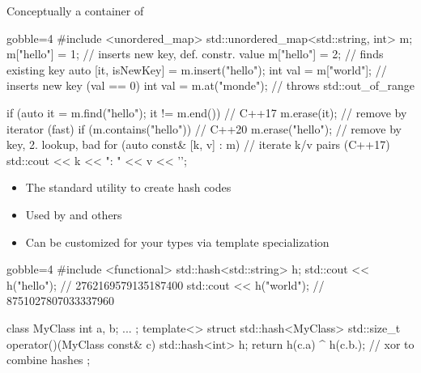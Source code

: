 \begin{frame}[fragile]
    \begin{block}{}
        Conceptually a container of 
    \end{block}
    \begin{cppcode*}{gobble=4}
        #include <unordered_map>
        std::unordered_map<std::string, int> m;
        m["hello"] = 1;  // inserts new key, def. constr. value
        m["hello"] = 2;  // finds existing key
        auto [it, isNewKey] = m.insert("hello");
        int val = m["world"];    // inserts new key (val == 0)
        int val = m.at("monde"); // throws std::out_of_range

        if (auto it = m.find("hello"); it != m.end()) // C++17
            m.erase(it);      // remove by iterator (fast)
        if (m.contains("hello")) // C++20
            m.erase("hello"); // remove by key, 2. lookup, bad
        for (auto const& [k, v] : m) // iterate k/v pairs (C++17)
            std::cout << k << ": " << v << '\n';
    \end{cppcode*}
\end{frame}

\begin{frame}[fragile]
    \begin{block}{}
        \begin{itemize}
            \item The standard utility to create hash codes
            \item Used by  and others
            \item Can be customized for your types via template specialization
        \end{itemize}
    \end{block}
    \begin{cppcode*}{gobble=4}
        #include <functional>
        std::hash<std::string> h;
        std::cout << h("hello"); // 2762169579135187400
        std::cout << h("world"); // 8751027807033337960

        class MyClass { int a, b; ... };
        template<> struct std::hash<MyClass> {
          std::size_t operator()(MyClass const& c) {
            std::hash<int> h;
            return h(c.a) ^ h(c.b.); // xor to combine hashes
          }
        };
    \end{cppcode*}
\end{frame}

